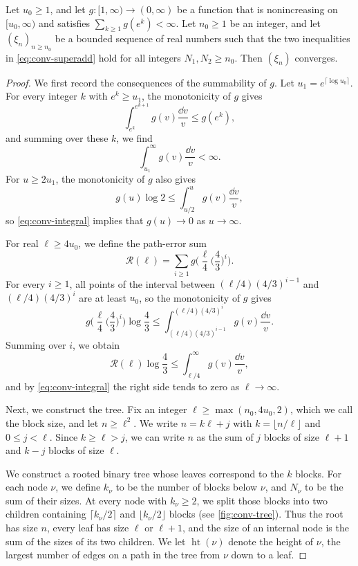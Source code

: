 \begin{lemma}\label{lem:conv-tree}
Let $u_0 \ge 1$, and let $g \colon [1, \infty) \to (0, \infty)$ be a function that is nonincreasing on $[u_0, \infty)$ and satisfies $\sum_{k \ge 1} g(e^k) < \infty$. Let $n_0 \ge 1$ be an integer, and let $(\xi_n)_{n \ge n_0}$ be a bounded sequence of real numbers such that the two inequalities in \eqref{eq:conv-superadd} hold for all integers $N_1, N_2 \ge n_0$. Then $(\xi_n)$ converges.
\end{lemma}

\begin{proof}
We first record the consequences of the summability of $g$. Let $u_1 = e^{\lceil \log u_0 \rceil}$. For every integer $k$ with $e^k \ge u_1$, the monotonicity of $g$ gives
\[
\int_{e^k}^{e^{k + 1}} g(v) \frac{\dd v}{v} \le g(e^k),
\]
and summing over these $k$, we find
\begin{equation}\label{eq:conv-integral}
\int_{u_1}^\infty g(v) \frac{\dd v}{v} < \infty.
\end{equation}
For $u \ge 2u_1$, the monotonicity of $g$ also gives
\[
g(u) \log 2 \le \int_{u/2}^{u} g(v) \frac{\dd v}{v},
\]
so \eqref{eq:conv-integral} implies that $g(u) \to 0$ as $u \to \infty$.

For real $\ell \ge 4u_0$, we define the path-error sum
\begin{equation}\label{eq:conv-pathsum}
\mathcal R(\ell) = \sum_{i \ge 1} g\Big(\frac \ell4 \Big(\frac 43\Big)^i\Big).
\end{equation}
For every $i \ge 1$, all points of the interval between $(\ell/4)(4/3)^{i - 1}$ and $(\ell/4)(4/3)^i$ are at least $u_0$, so the monotonicity of $g$ gives
\[
g\Big(\frac \ell4 \Big(\frac 43\Big)^i\Big) \log \frac 43 \le \int_{(\ell/4)(4/3)^{i - 1}}^{(\ell/4)(4/3)^i} g(v) \frac{\dd v}{v}.
\]
Summing over $i$, we obtain
\[
\mathcal R(\ell) \log \frac 43 \le \int_{\ell/4}^\infty g(v) \frac{\dd v}{v},
\]
and by \eqref{eq:conv-integral} the right side tends to zero as $\ell \to \infty$.

Next, we construct the tree. Fix an integer $\ell \ge \max(n_0, 4u_0, 2)$, which we call the block size, and let $n \ge \ell^2$. We write $n = k\ell + j$ with $k = \lfloor n/\ell \rfloor$ and $0 \le j < \ell$. Since $k \ge \ell > j$, we can write $n$ as the sum of $j$ blocks of size $\ell + 1$ and $k - j$ blocks of size $\ell$.

We construct a rooted binary tree whose leaves correspond to the $k$ blocks. For each node $\nu$, we define $k_\nu$ to be the number of blocks below $\nu$, and $N_\nu$ to be the sum of their sizes. At every node with $k_\nu \ge 2$, we split those blocks into two children containing $\lceil k_\nu/2\rceil$ and $\lfloor k_\nu/2\rfloor$ blocks (see \cref{fig:conv-tree}). Thus the root has size $n$, every leaf has size $\ell$ or $\ell + 1$, and the size of an internal node is the sum of the sizes of its two children. We let $\operatorname{ht}(\nu)$ denote the height of $\nu$, the largest number of edges on a path in the tree from $\nu$ down to a leaf.


\end{proof}
